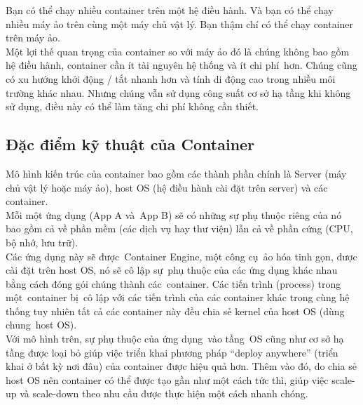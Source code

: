 \documentclass[14pt,a4paper]{report}
\begin{document}
	\hspace{0.3cm}Bạn có thể chạy nhiều container trên một hệ điều hành. Và bạn có thể chạy nhiều máy ảo trên cùng một máy chủ vật lý. Bạn thậm chí có thể chạy container trên máy ảo.\\
	
	\hspace{0.3cm}Một lợi thế quan trọng của container so với máy ảo đó là chúng không bao gồm hệ điều hành, container cần ít tài nguyên hệ thống và ít chi phí hơn. Chúng cũng có xu hướng khởi động / tắt nhanh hơn và tính di động cao trong nhiều môi trường khác nhau. Nhưng chúng vẫn sử dụng công suất cơ sở hạ tầng khi không sử dụng, điều này có thể làm tăng chi phí không cần thiết.
	\subsection{Đặc điểm kỹ thuật của Container}
	\hspace{1cm}Mô hình kiến trúc của container bao gồm các thành phần chính là Server (máy chủ vật lý hoặc máy ảo), host OS (hệ điều hành cài đặt trên server) và các container.\\
	
	\hspace{0.3cm}Mỗi một ứng dụng (App A và App B) sẽ có những sự phụ thuộc riêng của nó bao gồm cả về phần mềm (các dịch vụ hay thư viện) lẫn cả về phần cứng (CPU, bộ nhớ, lưu trữ).\\
	
	\hspace{0.3cm}Các ứng dụng này sẽ được Container Engine, một công cụ ảo hóa tinh gọn, được cài đặt trên host OS, nó sẽ cô lập sự phụ thuộc của các ứng dụng khác nhau bằng cách đóng gói chúng thành các container. Các tiến trình (process) trong một container bị cô lập với các tiến trình của các container khác trong cùng hệ thống tuy nhiên tất cả các container này đều chia sẻ kernel của host OS (dùng chung host OS).\\
	
	\hspace{0.3cm}Với mô hình trên, sự phụ thuộc của ứng dụng vào tầng OS cũng như cơ sở hạ tầng được loại bỏ giúp việc triển khai phương pháp “deploy anywhere” (triển khai ở bất kỳ nơi đâu) của container được hiệu quả hơn. Thêm vào đó, do chia sẻ host OS nên container có thể được tạo gần như một cách tức thì, giúp việc scale-up và scale-down theo nhu cầu được thực hiện một cách nhanh chóng.
\end{document}
